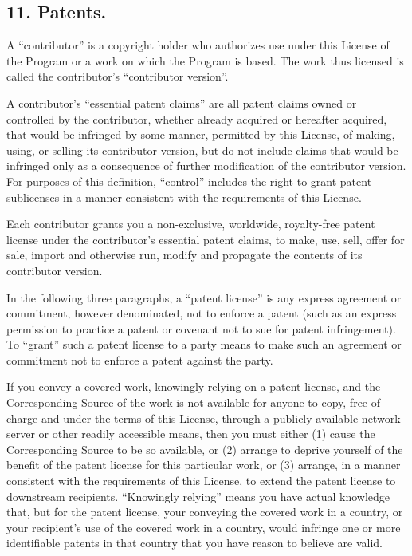 \documentclass[letterpaper,10pt,english]{sphinxmanual}
\begin{document}
\subsection{11. Patents.}
\label{license:patents}
A ``contributor'' is a copyright holder who authorizes use under this
License of the Program or a work on which the Program is based.  The
work thus licensed is called the contributor's ``contributor version''.

A contributor's ``essential patent claims'' are all patent claims
owned or controlled by the contributor, whether already acquired or
hereafter acquired, that would be infringed by some manner, permitted
by this License, of making, using, or selling its contributor version,
but do not include claims that would be infringed only as a
consequence of further modification of the contributor version.  For
purposes of this definition, ``control'' includes the right to grant
patent sublicenses in a manner consistent with the requirements of
this License.

Each contributor grants you a non-exclusive, worldwide, royalty-free
patent license under the contributor's essential patent claims, to
make, use, sell, offer for sale, import and otherwise run, modify and
propagate the contents of its contributor version.

In the following three paragraphs, a ``patent license'' is any express
agreement or commitment, however denominated, not to enforce a patent
(such as an express permission to practice a patent or covenant not to
sue for patent infringement).  To ``grant'' such a patent license to a
party means to make such an agreement or commitment not to enforce a
patent against the party.

If you convey a covered work, knowingly relying on a patent license,
and the Corresponding Source of the work is not available for anyone
to copy, free of charge and under the terms of this License, through a
publicly available network server or other readily accessible means,
then you must either (1) cause the Corresponding Source to be so
available, or (2) arrange to deprive yourself of the benefit of the
patent license for this particular work, or (3) arrange, in a manner
consistent with the requirements of this License, to extend the patent
license to downstream recipients.  ``Knowingly relying'' means you have
actual knowledge that, but for the patent license, your conveying the
covered work in a country, or your recipient's use of the covered work
in a country, would infringe one or more identifiable patents in that
country that you have reason to believe are valid.
\end{document}
